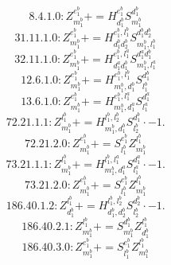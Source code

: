 \documentclass[letterpaper,10pt,fleqn,leqno,onecolumn]{article}
\begin{document}
\begin{equation} \;\;\;\;\;\;  8.4.1.0: Z^{e_{1}^{b}}_{m_{1}^{b}}+=H^{e_{1}^{b}}_{d_{1}^{b}}S^{d_{1}^{b}}_{m_{1}^{b}} \end{equation}
\begin{equation} \;\;\;\;\;\;  31.11.1.0: Z^{e_{1}^{b}}_{m_{1}^{b}}+=H^{e_{1}^{b},l_{1}^{b}}_{d_{1}^{b}d_{2}^{b}}S^{d_{1}^{b}d_{2}^{b}}_{m_{1}^{b},l_{1}^{b}} \end{equation}
\begin{equation} \;\;\;\;\;\;  32.11.1.0: Z^{e_{1}^{b}}_{m_{1}^{b}}+=H^{e_{1}^{b},l_{1}^{a}}_{d_{1}^{a}d_{1}^{b}}S^{d_{1}^{a}d_{1}^{b}}_{m_{1}^{b},l_{1}^{a}} \end{equation}
\begin{equation} \;\;\;\;\;\;  12.6.1.0: Z^{e_{1}^{b}}_{m_{1}^{b}}+=H^{e_{1}^{b},l_{1}^{b}}_{m_{1}^{b},d_{1}^{b}}S^{d_{1}^{b}}_{l_{1}^{b}} \end{equation}
\begin{equation} \;\;\;\;\;\;  13.6.1.0: Z^{e_{1}^{b}}_{m_{1}^{b}}+=H^{e_{1}^{b},l_{1}^{a}}_{m_{1}^{b},d_{1}^{a}}S^{d_{1}^{a}}_{l_{1}^{a}} \end{equation}
\begin{equation} \;\;\;\;\;\;  72.21.1.1: Z^{l_{1}^{b}}_{m_{1}^{b}}+=H^{l_{1}^{b},l_{2}^{b}}_{m_{1}^{b},d_{1}^{b}}S^{d_{1}^{b}}_{l_{2}^{b}}\cdot -1. \end{equation}
\begin{equation} \;\;\;\;\;\;  72.21.2.0: Z^{e_{1}^{b}}_{m_{1}^{b}}+=S^{e_{1}^{b}}_{l_{1}^{b}}Z^{l_{1}^{b}}_{m_{1}^{b}} \end{equation}
\begin{equation} \;\;\;\;\;\;  73.21.1.1: Z^{l_{1}^{b}}_{m_{1}^{b}}+=H^{l_{1}^{b},l_{1}^{a}}_{m_{1}^{b},d_{1}^{a}}S^{d_{1}^{a}}_{l_{1}^{a}}\cdot -1. \end{equation}
\begin{equation} \;\;\;\;\;\;  73.21.2.0: Z^{e_{1}^{b}}_{m_{1}^{b}}+=S^{e_{1}^{b}}_{l_{1}^{b}}Z^{l_{1}^{b}}_{m_{1}^{b}} \end{equation}
\begin{equation} \;\;\;\;\;\;  186.40.1.2: Z^{l_{1}^{b}}_{d_{1}^{b}}+=H^{l_{1}^{b},l_{2}^{b}}_{d_{1}^{b},d_{2}^{b}}S^{d_{2}^{b}}_{l_{2}^{b}}\cdot -1. \end{equation}
\begin{equation} \;\;\;\;\;\;  186.40.2.1: Z^{l_{1}^{b}}_{m_{1}^{b}}+=S^{d_{1}^{b}}_{m_{1}^{b}}Z^{l_{1}^{b}}_{d_{1}^{b}} \end{equation}
\begin{equation} \;\;\;\;\;\;  186.40.3.0: Z^{e_{1}^{b}}_{m_{1}^{b}}+=S^{e_{1}^{b}}_{l_{1}^{b}}Z^{l_{1}^{b}}_{m_{1}^{b}} \end{equation}
\end{document}
